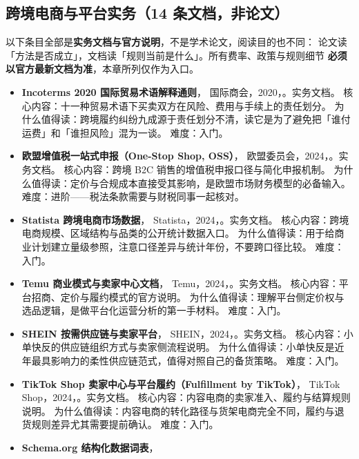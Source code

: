 \subsection{跨境电商与平台实务（14 条文档，非论文）}

以下条目全部是\textbf{实务文档与官方说明}，不是学术论文，阅读目的也不同：
论文读「方法是否成立」，文档读「规则当前是什么」。所有费率、政策与规则细节
\textbf{必须以官方最新文档为准}，本章所列仅作为入口。

\begin{itemize}
  \item \textbf{Incoterms 2020 国际贸易术语解释通则}，
        国际商会，2020，\cite{incoterms2020}。实务文档。
        核心内容：十一种贸易术语下买卖双方在风险、费用与手续上的责任划分。
        为什么值得读：跨境履约纠纷九成源于责任划分不清，读它是为了避免把「谁付运费」和「谁担风险」混为一谈。
        难度：入门。
  \item \textbf{欧盟增值税一站式申报（One-Stop Shop, OSS）}，
        欧盟委员会，2024，\cite{eu_oss}。实务文档。
        核心内容：跨境 B2C 销售的增值税申报口径与简化申报机制。
        为什么值得读：定价与合规成本直接受其影响，是欧盟市场财务模型的必备输入。
        难度：进阶——税法条款需要与财税同事一起核对。
  \item \textbf{Statista 跨境电商市场数据}，
        Statista，2024，\cite{statista_ecommerce}。实务文档。
        核心内容：跨境电商规模、区域结构与品类的公开统计数据入口。
        为什么值得读：用于给商业计划建立量级参照，注意口径差异与统计年份，不要跨口径比较。
        难度：入门。
  \item \textbf{Temu 商业模式与卖家中心文档}，
        Temu，2024，\cite{temu_about}。实务文档。
        核心内容：平台招商、定价与履约模式的官方说明。
        为什么值得读：理解平台侧定价权与选品逻辑，是做平台化运营分析的第一手材料。
        难度：入门。
  \item \textbf{SHEIN 按需供应链与卖家平台}，
        SHEIN，2024，\cite{shein_about}。实务文档。
        核心内容：小单快反的供应链组织方式与卖家侧流程说明。
        为什么值得读：小单快反是近年最具影响力的柔性供应链范式，值得对照自己的备货策略。
        难度：入门。
  \item \textbf{TikTok Shop 卖家中心与平台履约（Fulfillment by TikTok）}，
        TikTok Shop，2024，\cite{tiktokshop_about}。实务文档。
        核心内容：内容电商的卖家准入、履约与结算规则说明。
        为什么值得读：内容电商的转化路径与货架电商完全不同，履约与退货规则差异尤其需要提前确认。
        难度：入门。
  \item \textbf{Schema.org 结构化数据词表}，

\end{itemize}
